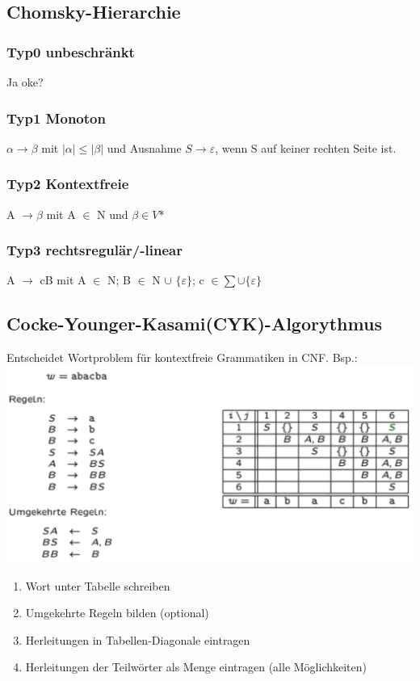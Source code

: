\documentclass[12pt,a4paper]{article}
\begin{document}
	\subsection{Chomsky-Hierarchie}
	\subsubsection{Typ0 unbeschränkt}
	Ja oke?

    \subsubsection{Typ1 Monoton}
    $\alpha \rightarrow \beta$ mit $| \alpha | \leq  | \beta |$ und Ausnahme $S \rightarrow \varepsilon$, wenn S auf keiner rechten Seite ist.

    \subsubsection{Typ2 Kontextfreie}
	A $\rightarrow \beta$ mit A $\in$ N und $\beta \in V$* 

    \subsubsection{Typ3 rechtsregulär/-linear}
	A $\rightarrow$ cB mit A $\in$ N; B $\in$ N $\cup$ $\{ \varepsilon \}$; c $\in \sum \cup \{ \varepsilon \}$

	\subsection{Cocke-Younger-Kasami(CYK)-Algorythmus}
	Entscheidet Wortproblem für kontextfreie Grammatiken in CNF. Bsp.:\\
	\includegraphics[scale=0.3]{Bilder/cyk-Algo.png}
	\begin{enumerate}
		\item Wort unter Tabelle schreiben 
		\item Umgekehrte Regeln bilden (optional)
		\item Herleitungen in Tabellen-Diagonale eintragen
		\item Herleitungen der Teilwörter als Menge eintragen (alle Möglichkeiten)
	\end{enumerate}
\end{document}
